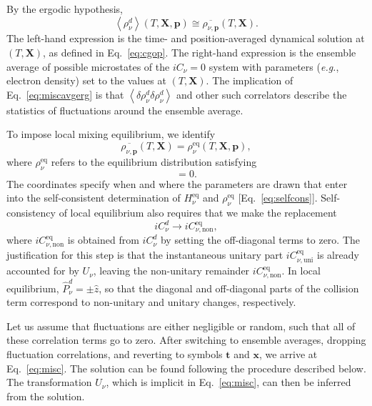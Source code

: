 \documentclass[aps,prd,twocolumn,groupedaddress,preprintnumbers]{revtex4-2}
\begin{document}
By the ergodic hypothesis,
\begin{equation}
\left\langle \rho^d_\nu \right\rangle (T, \boldsymbol{X}, \boldsymbol{p}) \cong \overline{\rho_{\nu,\boldsymbol{p}}} (T, \boldsymbol{X}). \label{eq:miscavgerg}
\end{equation}
The left-hand expression is the time- and position-averaged dynamical solution at $(T, \boldsymbol{X})$, as defined in Eq.~\eqref{eq:cgop}. The right-hand expression is the ensemble average of possible microstates of the $iC_\nu = 0 $ system with parameters (\textit{e.g.}, electron density) set to the values at $(T, \boldsymbol{X})$. The implication of Eq.~\eqref{eq:miscavgerg} is that $\left\langle \delta \rho^d_\nu \delta \rho^d_\nu \right\rangle$ and other such correlators describe the statistics of fluctuations around the ensemble average.

To impose local mixing equilibrium, we identify
\begin{equation}
\overline{\rho_{\nu,\boldsymbol{p}}} (T, \boldsymbol{X}) = \rho_\nu^\textrm{eq} (T, \boldsymbol{X}, \boldsymbol{p}),
\end{equation}
where $\rho_\nu^\textrm{eq}$ refers to the equilibrium distribution satisfying
\begin{equation}
[H^{\textrm{eq}}_{\nu}, \rho^{\textrm{eq}}_{\nu}] = 0.
\end{equation}
The coordinates specify when and where the parameters are drawn that enter into the self-consistent determination of $H^{\textrm{eq}}_{\nu}$ and $\rho^{\textrm{eq}}_{\nu}$ [Eq.~\eqref{eq:selfcons}]. Self-consistency of local equilibrium also requires that we make the replacement
\begin{equation}
    iC^d_\nu \longrightarrow iC^{\textrm{eq}}_{\nu,\textrm{non}},
\end{equation}
where $iC^{\textrm{eq}}_{\nu,\textrm{non}}$ is obtained from $iC^d_\nu$ by setting the off-diagonal terms to zero. The justification for this step is that the instantaneous unitary part $iC^{\textrm{eq}}_{\nu,\textrm{uni}}$ is already accounted for by $U_{\nu}$, leaving the non-unitary remainder $iC^{\textrm{eq}}_{\nu,\textrm{non}}$. In local equilibrium, $\hat{P}^d_{\nu} = \pm\hat{z}$, so that the diagonal and off-diagonal parts of the collision term correspond to non-unitary and unitary changes, respectively.

Let us assume that fluctuations are either negligible or random, such that all of these correlation terms go to zero. After switching to ensemble averages, dropping fluctuation correlations, and reverting to symbols $\boldsymbol{t}$ and $\boldsymbol{x}$, we arrive at Eq.~\eqref{eq:misc}. The solution can be found following the procedure described below. The transformation $U_{\nu}$, which is implicit in Eq.~\eqref{eq:misc}, can then be inferred from the solution.
\end{document}
